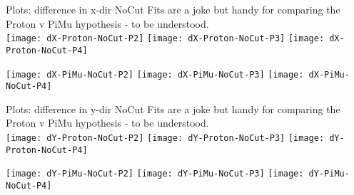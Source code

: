 \documentclass[11.5pt,sans,english]{beamer}
\begin{document}
\begin{frame}{Plots: difference in x-dir NoCut}
Fits are a joke but handy for comparing the Proton v PiMu hypothesis - to be understood.\\

\texttt{[image: dX-Proton-NoCut-P2]}
\texttt{[image: dX-Proton-NoCut-P3]}
\texttt{[image: dX-Proton-NoCut-P4]}

\texttt{[image: dX-PiMu-NoCut-P2]}
\texttt{[image: dX-PiMu-NoCut-P3]}
\texttt{[image: dX-PiMu-NoCut-P4]}

\end{frame}

 \begin{frame}{Plots: difference in y-dir NoCut}
Fits are a joke but handy for comparing the Proton v PiMu hypothesis - to be understood.\\

\texttt{[image: dY-Proton-NoCut-P2]}
\texttt{[image: dY-Proton-NoCut-P3]}
\texttt{[image: dY-Proton-NoCut-P4]}

\texttt{[image: dY-PiMu-NoCut-P2]}
\texttt{[image: dY-PiMu-NoCut-P3]}
\texttt{[image: dY-PiMu-NoCut-P4]}

\end{frame}
\end{document}
